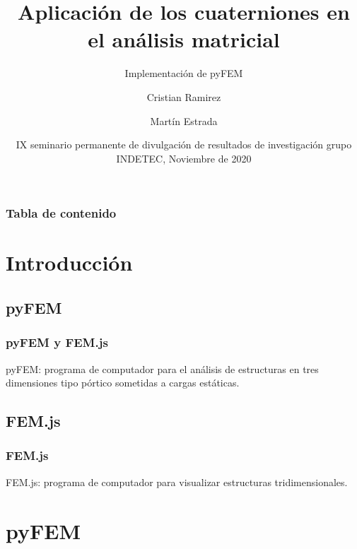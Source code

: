 \documentclass{beamer}
\title[Cuaterniones en pyFEM] %
{Aplicación de los cuaterniones en el análisis matricial}
\subtitle{Implementación de pyFEM}
\author[Ramirez, Estrada] %
{Cristian Ramirez \and Martín Estrada}
\institute[UNAL] %
{
  Facultad de ingeniería\\
  Universidad Nacional de Colombia
}
\date[INDETEC 2020] %
{IX seminario permanente de divulgación de resultados de investigación grupo INDETEC, Noviembre de 2020}
\begin{document}
\begin{frame}
  \titlepage
\end{frame}

\begin{frame}
  \frametitle{Tabla de contenido}
  \tableofcontents
\end{frame}

\section{Introducción}
\subsection{pyFEM}
\begin{frame}
  \frametitle{pyFEM y FEM.js}
  pyFEM: programa de computador para el análisis de estructuras en tres dimensiones tipo pórtico sometidas a cargas estáticas.
\end{frame}

\subsection{FEM.js}
\begin{frame}
  \frametitle{FEM.js}
  FEM.js: programa de computador para visualizar estructuras tridimensionales.
\end{frame}

\section{pyFEM}
\end{document}
